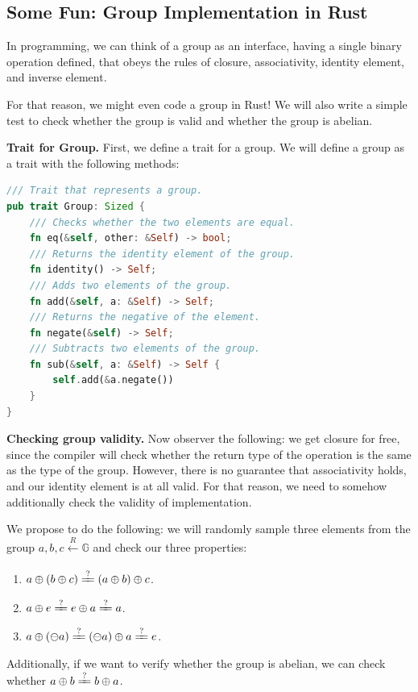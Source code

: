 \documentclass[../lecture-notes.tex]{subfiles}
\begin{document}
\subsection{Some Fun: Group Implementation in Rust}

In programming, we can think of a group as an interface, having a single binary operation defined, that obeys the rules of closure, associativity, identity element, and inverse element.

For that reason, we might even code a group in Rust! We will also write a simple test to check whether the group is valid and whether the group is abelian.

\textbf{Trait for Group.} First, we define a trait for a group. We will define a group as a trait with the following methods:
\begin{lstlisting}[language=Rust]
/// Trait that represents a group.
pub trait Group: Sized {
    /// Checks whether the two elements are equal.
    fn eq(&self, other: &Self) -> bool;
    /// Returns the identity element of the group.
    fn identity() -> Self;
    /// Adds two elements of the group.
    fn add(&self, a: &Self) -> Self;
    /// Returns the negative of the element.
    fn negate(&self) -> Self;
    /// Subtracts two elements of the group.
    fn sub(&self, a: &Self) -> Self {
        self.add(&a.negate())
    }
}
\end{lstlisting}

\textbf{Checking group validity.} Now observer the following: we get closure for free, since the compiler will check whether the return type of the operation is the same as the type of the group. 
However, there is no guarantee that associativity holds, and our identity element is at all valid. For that reason, we need to somehow additionally check the
validity of implementation.

We propose to do the following: we will randomly sample three elements from the group $a,b,c \xleftarrow[]{R} \mathbb{G}$ and check our three properties:
\begin{enumerate}
    \item $a \oplus (b \oplus c) \xlongequal{?} (a \oplus b) \oplus c$.
    \item $a \oplus e \xlongequal{?} e \oplus a \xlongequal{?} a $.
    \item $a \oplus (\ominus a) \xlongequal{?} (\ominus a) \oplus a \xlongequal{?} e$.
\end{enumerate}

Additionally, if we want to verify whether the group is abelian, we can check whether $a \oplus b \xlongequal{?} b \oplus a$. 
\end{document}
